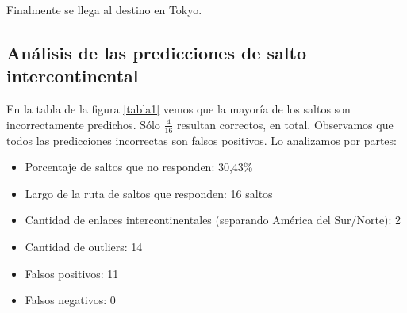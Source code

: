 Finalmente se llega al destino en Tokyo.

\subsection{Análisis de las predicciones de salto intercontinental}

En la tabla de la figura \ref{tabla1} vemos que la mayoría de los saltos son incorrectamente predichos. Sólo $\frac{4}{16}$ resultan correctos, en total. Observamos que todos las predicciones incorrectas son falsos positivos. Lo analizamos por partes:

\begin{itemize}
	\item Porcentaje de saltos que no responden: 30,43\%
	\item Largo de la ruta de saltos que responden: 16 saltos 
	\item Cantidad de enlaces intercontinentales (separando América del Sur/Norte): 2
	\item Cantidad de outliers: 14
	\item Falsos positivos: 11
	\item Falsos negativos: 0
\end{itemize}

